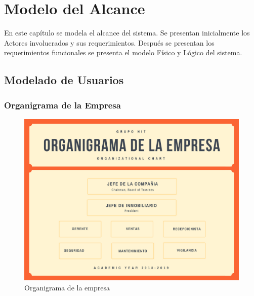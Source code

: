 \chapter{Modelo del Alcance}
\label{cap:reqUsr}

	En este capítulo se modela el alcance del sistema. Se presentan inicialmente los Actores involucrados y sus requerimientos. Después se presentan los requerimientos funcionales se presenta el modelo Físico y Lógico del sistema.


\section{Modelado de Usuarios}

\subsection{Organigrama de la Empresa}



\begin{figure}[htbp]
	\begin{center}
		\includegraphics[width=.8\textwidth]{images/organigrama}
		\caption{Organigrama de la empresa}
		\label{fig:organigrama}
	\end{center}
\end{figure}

